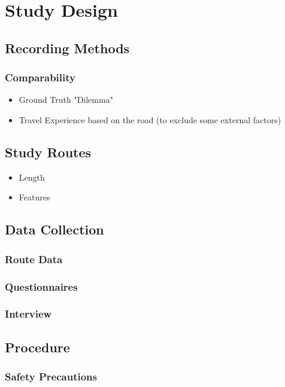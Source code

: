 \section{Study Design}\label{sec:study_design}

\subsection{Recording Methods}\label{subsec:recording_methods}

\subsubsection{Comparability}

\begin{itemize}
    \item Ground Truth "Dilemma"
    \item Travel Experience based on the road (to exclude some external factors)
\end{itemize}

\subsection{Study Routes}

\begin{itemize}
    \item Length
    \item Features
\end{itemize}

\subsection{Data Collection}

\subsubsection{Route Data}

\subsubsection{Questionnaires}

\subsubsection{Interview}

\subsection{Procedure}

\subsubsection{Safety Precautions}
